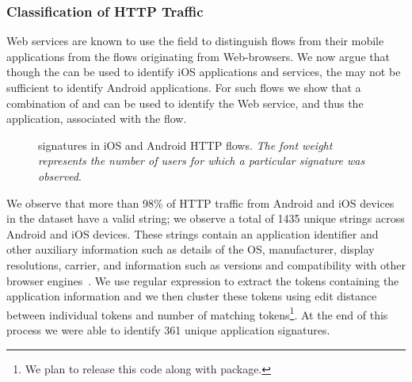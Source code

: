 \subsubsection{Classification of HTTP Traffic}

Web services are known to use the \useragent field to distinguish flows from their mobile applications from the flows originating from Web-browsers.
We now argue that though the \useragent can be used to identify iOS applications and services, the \useragent may not be sufficient to identify Android applications.
For such flows we show that a combination of \useragent and \httphost can be used to identify the Web service, and thus the application, associated with the flow.


\begin{figure}
\newline
{}
\caption{\useragent signatures in  iOS and Android HTTP flows. \emph{The font weight represents the number of users for which a particular signature was observed}.}
\label{fig:http-wordcloud}
\end{figure}

We observe that more than 98\% of HTTP traffic from Android and iOS devices in the \mobWild dataset have a valid \useragent string; we observe a total of 1435 unique \useragent strings across Android and iOS devices. 
These \useragent strings contain an application identifier and other auxiliary information such as details of the OS, manufacturer, display resolutions, carrier, and information such as versions and compatibility with other browser engines~\cite{mozilla:useragentdetection}. 
We use regular expression to extract the tokens containing the application information and we then cluster these tokens using edit distance between individual tokens and number of matching tokens\footnote{We plan to release this code along with \platname package.}.
At the end of this process we were able to identify 361 unique application signatures.


